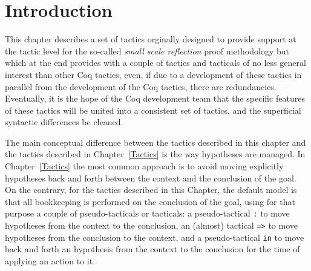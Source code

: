 
\newcommand{\ssr}{{\sc SSReflect}}

\ifhevea\newcommand{\ssrC}[1]{\texttt{#1}}\else\newcommand{\ssrC}[1]{\text{\lstinline!#1!}}\fi
\ifhevea\renewenvironment{center}{\@open{div}{class="center"}\@open{div}{class="centered"}}{\@close{div}\@close{div}}\fi
\newcommand\ssrN[2][]{{\textsl {#2}}\ensuremath{_{#1}}}
\ifhevea\newcommand{\underbar}[1]{\underline{#1}}\fi

\let\ssrL=\lstinline

\newcommand{\iitem}{{\it i-item}}
\newcommand{\ditem}{{\it d-item}}
\newcommand{\optional}[1]{{\it[}#1{\it]}}
\newcommand{\optsep}{{\it|}}
\newcommand{\idx}[1]{\tacindex{#1 (ssreflect)}}
\newcommand{\idxC}[1]{\comindex{#1 (ssreflect)}}

\newenvironment{new}%
  {\begin{Sbox}\begin{minipage}{0.97\textwidth}%
    \begin{flushright}\textcolor{red}{\fbox{Version 1.3}}%
      \end{flushright}\noindent}%
  {\end{minipage}\end{Sbox}\noindent\doublebox{\TheSbox}}
\section{Introduction}\label{sec:intro}

This chapter describes a set of tactics orginally designed to provide
support at the tactic level for the so-called \emph{small scale
reflection} proof methodology but which at the end provides with a
couple of tactics and tacticals of no less general interest than other
Coq tactics, even, if due to a development of these tactics in
parallel from the development of the Coq tactics, there are
redundancies. Eventually, it is the hope of the Coq development team
that the specific features of these tactics will be united into a
consistent set of tactics, and the superficial syntactic differences
be cleaned.

The main conceptual difference between the tactics described in this
chapter and the tactics described in Chapter~\ref{Tactics} is the way
hypotheses are managed. In Chapter~\ref{Tactics} the most common
approach is to avoid moving explicitly hypotheses back and forth
between the context and the conclusion of the goal. On the contrary,
for the tactics described in this Chapter, the default model is that
all bookkeeping is performed on the conclusion of the goal, using for
that purpose a couple of pseudo-tacticals or tacticals: a
pseudo-tactical {\tt :} to move hypotheses from the context to the
conclusion, an (almost) tactical {\tt =>} to move hypotheses from the
conclusion to the context, and a pseudo-tactical {\tt in} to move back
and forth an hypothesis from the context to the conclusion for the
time of applying an action to it.

